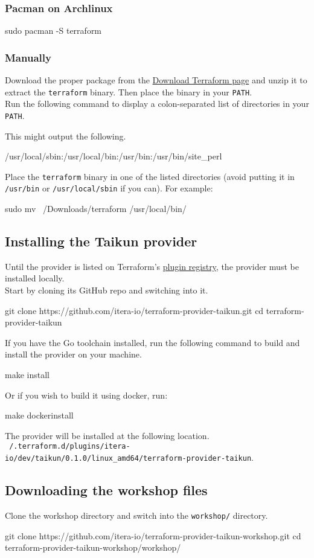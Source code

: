\subsubsection{Pacman on Archlinux}
\begin{shell}
sudo pacman -S terraform
\end{shell}

\subsubsection{Manually}
Download the proper package from the \href{https://www.terraform.io/downloads.html}{Download Terraform page}
and unzip it to extract the \texttt{terraform} binary.
Then place the binary in your \texttt{PATH}.\\

Run the following command to display a colon-separated list of directories in your \texttt{PATH}.
This might output the following.
\begin{raw}
/usr/local/sbin:/usr/local/bin:/usr/bin:/usr/bin/site_perl
\end{raw}
Place the \texttt{terraform} binary in one of the listed directories (avoid putting it in \texttt{/usr/bin} or \texttt{/usr/local/sbin} if you can).
For example:
\begin{shell}
sudo mv ~/Downloads/terraform /usr/local/bin/
\end{shell}

\subsection{Installing the Taikun provider}
Until the provider is listed on Terraform's \href{https://registry.terraform.io/browse/providers}{plugin registry},
the provider must be installed locally.\\

Start by cloning its GitHub repo and switching into it.
\begin{shell}
git clone https://github.com/itera-io/terraform-provider-taikun.git
cd terraform-provider-taikun
\end{shell}
If you have the Go toolchain installed,
run the following command to build and install the provider on your machine.
\begin{shell}
make install
\end{shell}
Or if you wish to build it using docker, run:
\begin{shell}
make dockerinstall
\end{shell}
The provider will be installed at the following location.\\
\texttt{~/.terraform.d/plugins/itera-io/dev/taikun/0.1.0/linux\_amd64/terraform-provider-taikun}.

\subsection{Downloading the workshop files}
Clone the workshop directory and switch into the \texttt{workshop/} directory.
\begin{shell}
git clone https://github.com/itera-io/terraform-provider-taikun-workshop.git
cd terraform-provider-taikun-workshop/workshop/
\end{shell}
